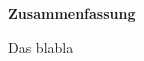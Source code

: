 \vspace*{\fill}
\begin{center}
\Large
\textbf{Zusammenfassung}
\end{center}

Das blabla
\vspace*{\fill}
